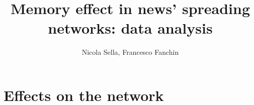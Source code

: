 \documentclass[11pt]{article} %
\title{Memory effect in news' spreading networks: data analysis}
\author{Nicola Sella, Francesco Fanchin}
\begin{document}
\maketitle

\newpage

\tableofcontents

\newpage



\newpage




\newpage
\section{Effects on the network}



\newpage



\newpage



\newpage


\end{document}

